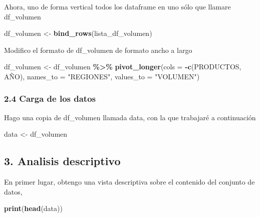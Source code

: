 \documentclass[
]{article}
\newenvironment{Shaded}{\begin{snugshade}}{\end{snugshade}}
\newcommand{\AttributeTok}[1]{\textcolor[rgb]{0.13,0.29,0.53}{#1}}
\newcommand{\FunctionTok}[1]{\textcolor[rgb]{0.13,0.29,0.53}{\textbf{#1}}}
\newcommand{\NormalTok}[1]{#1}
\newcommand{\OtherTok}[1]{\textcolor[rgb]{0.56,0.35,0.01}{#1}}
\newcommand{\SpecialCharTok}[1]{\textcolor[rgb]{0.81,0.36,0.00}{\textbf{#1}}}
\newcommand{\StringTok}[1]{\textcolor[rgb]{0.31,0.60,0.02}{#1}}
\begin{document}
Ahora, uno de forma vertical todos los dataframe en uno sólo que llamare
df\_volumen

\begin{Shaded}
\begin{Highlighting}[]
\NormalTok{df\_volumen }\OtherTok{\textless{}{-}} \FunctionTok{bind\_rows}\NormalTok{(lista\_df\_volumen)}
\end{Highlighting}
\end{Shaded}

Modifico el formato de df\_volumen de formato ancho a largo

\begin{Shaded}
\begin{Highlighting}[]
\NormalTok{df\_volumen }\OtherTok{\textless{}{-}}\NormalTok{ df\_volumen }\SpecialCharTok{\%\textgreater{}\%}
  \FunctionTok{pivot\_longer}\NormalTok{(}\AttributeTok{cols =} \SpecialCharTok{{-}}\FunctionTok{c}\NormalTok{(PRODUCTOS, AÑO), }
               \AttributeTok{names\_to =} \StringTok{"REGIONES"}\NormalTok{,}
               \AttributeTok{values\_to =} \StringTok{"VOLUMEN"}\NormalTok{)}
\end{Highlighting}
\end{Shaded}

\hypertarget{carga-de-los-datos}{%
\subsubsection{2.4 Carga de los datos}\label{carga-de-los-datos}}

Hago una copia de df\_volumen llamada data, con la que trabajaré a
continuación

\begin{Shaded}
\begin{Highlighting}[]
\NormalTok{data }\OtherTok{\textless{}{-}}\NormalTok{ df\_volumen}
\end{Highlighting}
\end{Shaded}

\hypertarget{analisis-descriptivo}{%
\subsection{3. Analisis descriptivo}\label{analisis-descriptivo}}

En primer lugar, obtengo una vista descriptiva sobre el contenido del
conjunto de datos,

\begin{Shaded}
\begin{Highlighting}[]
\FunctionTok{print}\NormalTok{(}\FunctionTok{head}\NormalTok{(data))}
\end{Highlighting}
\end{Shaded}
\end{document}
